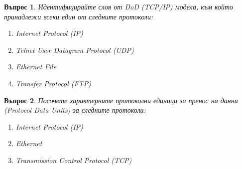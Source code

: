 \documentclass[11pt]{scrartcl}
\newtheorem{q}{Въпрос}
\newenvironment{defractors}{
\begin{enumerate}
  \setlength{\itemsep}{1pt}
  \setlength{\parskip}{0pt}
  \setlength{\parsep}{0pt}
}{\end{enumerate}}
\begin{document}
\begin{q}
  Идентифицирайте слоя от DoD (TCP/IP) модела, към който принадлежи всеки един
  от следните протоколи:

  \begin{defractors}
    \item Internet Protocol (IP)
    \item Telnet User Datagram Protocol (UDP)
    \item Ethernet File
    \item Transfer Protocol (FTP)
  \end{defractors}
\end{q}

\begin{q}
  Посочете характерните протоколни единици за пренос на данни (Protocol Data
  Units) за следните протоколи:

  \begin{defractors}
  \item Internet Protocol (IP)
  \item Ethernet
  \item Transmission Control Protocol (TCP)
  \end{defractors}
\end{q}
\end{document}
